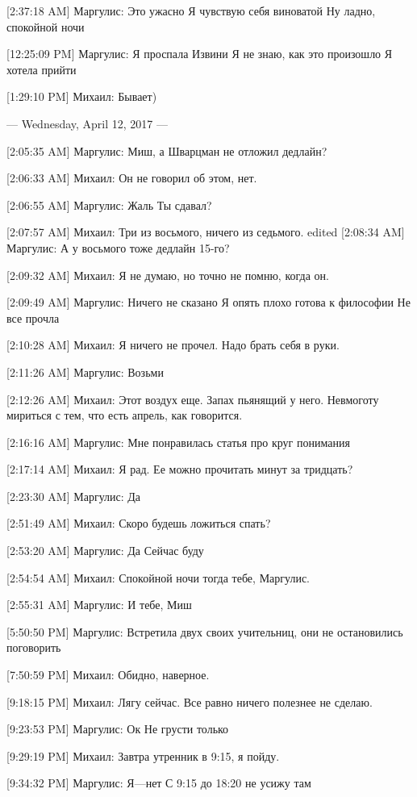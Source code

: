 \documentclass{article}
\begin{document}
[2:37:18 AM] Маргулис:
Это ужасно
 Я чувствую себя виноватой
 Ну ладно, спокойной ночи

[12:25:09 PM] Маргулис:
Я проспала
 Извини
 Я не знаю, как это произошло
 Я хотела прийти

[1:29:10 PM] Михаил:
Бывает)

--- Wednesday, April 12, 2017 ---

[2:05:35 AM] Маргулис:
Миш, а Шварцман не отложил дедлайн?

[2:06:33 AM] Михаил:
Он не говорил об этом, нет.

[2:06:55 AM] Маргулис:
Жаль
 Ты сдавал?

[2:07:57 AM] Михаил:
Три из восьмого, ничего из седьмого.
edited 
[2:08:34 AM] Маргулис:
А у восьмого тоже дедлайн 15-го?

[2:09:32 AM] Михаил:
Я не думаю, но точно не помню, когда он.

[2:09:49 AM] Маргулис:
Ничего не сказано
 Я опять плохо готова к философии
 Не все прочла

[2:10:28 AM] Михаил:
Я ничего не прочел.
 Надо брать себя в руки.

[2:11:26 AM] Маргулис:
Возьми

[2:12:26 AM] Михаил:
Этот воздух еще. Запах пьянящий у него.
 Невмоготу мириться с тем, что есть апрель, как говорится.

[2:16:16 AM] Маргулис:
Мне понравилась статья про круг понимания

[2:17:14 AM] Михаил:
Я рад. Ее можно прочитать минут за тридцать?

[2:23:30 AM] Маргулис:
Да

[2:51:49 AM] Михаил:
Скоро будешь ложиться спать?

[2:53:20 AM] Маргулис:
Да
 Сейчас буду

[2:54:54 AM] Михаил:
Спокойной ночи тогда тебе, Маргулис.

[2:55:31 AM] Маргулис:
И тебе, Миш

[5:50:50 PM] Маргулис:
Встретила двух своих учительниц, они не остановились поговорить

[7:50:59 PM] Михаил:
Обидно, наверное.

[9:18:15 PM] Михаил:
Лягу сейчас. Все равно ничего полезнее не сделаю.

[9:23:53 PM] Маргулис:
Ок
 Не грусти только

[9:29:19 PM] Михаил:
Завтра утренник в 9:15, я пойду.

[9:34:32 PM] Маргулис:
Я—нет
 С 9:15 до 18:20 не усижу там
\end{document}
